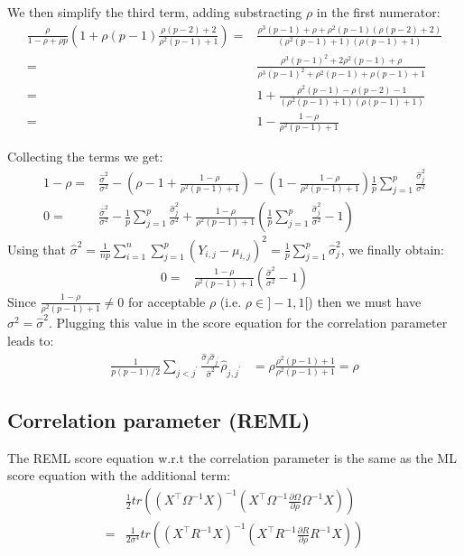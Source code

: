 \documentclass[12pt]{article}
\newcommand\trans[1]{{#1}^\intercal}%
\begin{document}
We then simplify the third term, adding substracting \(\rho\) in the first numerator:
\begin{align*}
\frac{\rho}{1-\rho+\rho p} \left(1 + \rho (p-1) \frac{\rho(p-2)  + 2}{\rho^2(p-1) + 1} \right) =& \frac{\rho^3(p-1) + \rho + \rho^2 (p-1)(\rho(p-2)+2) }{(\rho^2(p-1) + 1)(\rho(p-1)+1)}  \\
=& \frac{\rho^3(p-1)^2 + 2\rho^2(p-1) + \rho}{\rho^3(p-1)^2 + \rho^2(p-1) + \rho(p-1) + 1}  \\
=& 1 + \frac{\rho^2(p-1) - \rho (p-2) - 1}{(\rho^2(p-1) + 1)(\rho(p-1)+1)}  \\
=& 1 - \frac{1-\rho}{\rho^2(p-1) + 1} 
\end{align*}

Collecting the terms we get:
\begin{align*}
1- \rho =& \frac{\widehat{\sigma}^2}{\sigma^2}  - \left(\rho - 1 + \frac{1-\rho}{\rho^2(p-1) + 1}\right)  - \left(1 - \frac{1-\rho}{\rho^2(p-1) + 1} \right)\frac{1}{p} \sum_{j=1}^p \frac{\widehat{\sigma}^2_j}{\sigma^2}  \\
0 =& \frac{\widehat{\sigma}^2}{\sigma^2} -\frac{1}{p} \sum_{j=1}^p \frac{\widehat{\sigma}^2_j}{\sigma^2} + \frac{1-\rho}{\rho^2(p-1) + 1} \left(\frac{1}{p} \sum_{j=1}^p \frac{\widehat{\sigma}^2_j}{\sigma^2} - 1\right)
\end{align*}
Using that \(\widehat{\sigma}^2 = \frac{1}{np}\sum_{i=1}^n\sum_{j=1}^p (Y_{i,j}-\mu_{i,j})^2 = \frac{1}{p}\sum_{j=1}^p \widehat{\sigma}^2_j\), we finally obtain:
\begin{align*}
0 =& \frac{1-\rho}{\rho^2(p-1) + 1} \left(\frac{\widehat{\sigma}^2}{\sigma^2}-1\right) 
\end{align*}
Since \(\frac{1-\rho}{\rho^2(p-1) + 1}\neq 0\) for acceptable \(\rho\)
(i.e. \(\rho \in ]-1,1[\)) then we must have \(\sigma^2 =
\widehat{\sigma}^2\). Plugging this value in the score equation for
the correlation parameter leads to:
\begin{align*}
\frac{1}{p(p-1)/2}\sum_{j < j^{\prime}}\frac{\widehat{\sigma}_j \widehat{\sigma}_{j^{\prime}}}{\widehat{\sigma}^2}\widehat{\rho}_{j,j^{\prime}} &= \rho
\frac{\rho^2(p-1) + 1}{\rho^2(p-1) + 1} = \rho
\end{align*}

\subsection{Correlation parameter (REML)}
\label{sec:orgeee3df8}

The REML score equation w.r.t the correlation parameter is the same as the ML score equation with the additional term:
\begin{align*}
&\frac{1}{2} tr\left(\left(\trans{X}\Omega^{-1}X\right)^{-1} \left(\trans{X}\Omega^{-1}\frac{\partial \Omega}{\partial\rho}\Omega^{-1}X \right) \right) \\
=&\frac{1}{2 \sigma^4} tr\left(\left(\trans{X}R^{-1}X\right)^{-1} \left(\trans{X}R^{-1}\frac{\partial R}{\partial\rho}R^{-1}X \right) \right) 
\end{align*}
\end{document}
